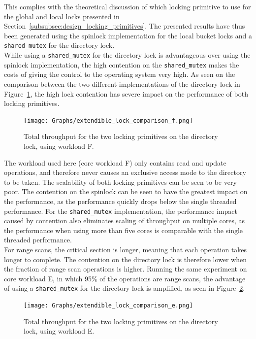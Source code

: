 \documentclass[11pt]{article} %
\begin{document}
This complies with the theoretical discussion of which locking primitive to use for the global and local locks presented in Section~\ref{subsubsec:design_locking_primitives}. The presented results have thus been generated using the spinlock implementation for the local bucket locks and a \verb|shared_mutex| for the directory lock.\\

While using a \verb|shared_mutex| for the directory lock is advantageous over using the spinlock implementation, the high contention on the \verb|shared_mutex| makes the costs of giving the control to the operating system very high. As seen on the comparison between the two different implementations of the directory lock in Figure~\ref{fig:extendible_lock_comparison}, the high lock contention has severe impact on the performance of both locking primitives. 

\begin{figure}[H]
  \centering
  \texttt{[image: Graphs/extendible\_lock\_comparison\_f.png]}\\
  \caption{Total throughput for the two locking primitives on the directory lock, using workload F.}\label{fig:extendible_lock_comparison}
\end{figure}

The workload used here (core workload F) only contains read and update operations, and therefore never causes an exclusive access mode to the directory to be taken. The scalability of both locking primitives can be seen to be very poor. The contention on the spinlock can be seen to have the greatest impact on the performance, as the performance quickly drops below the single threaded performance. For the \verb|shared_mutex| implementation, the performance impact caused by contention also eliminates scaling of throughput on multiple cores, as the performance when using more than five cores is comparable with the single threaded performance.\\

For range scans, the critical section is longer, meaning that each operation takes longer to complete. The contention on the directory lock is therefore lower when the fraction of range scan operations is higher. Running the same experiment on core workload E, in which 95\% of the operations are range scans, the advantage of using a \verb|shared_mutex| for the directory lock is amplified, as seen in Figure~\ref{fig:extendible_lock_comparison_e}.

\begin{figure}[H]
  \centering
  \texttt{[image: Graphs/extendible\_lock\_comparison\_e.png]}\\
  \caption{Total throughput for the two locking primitives on the directory lock, using workload E.}\label{fig:extendible_lock_comparison_e}
\end{figure}
\end{document}
